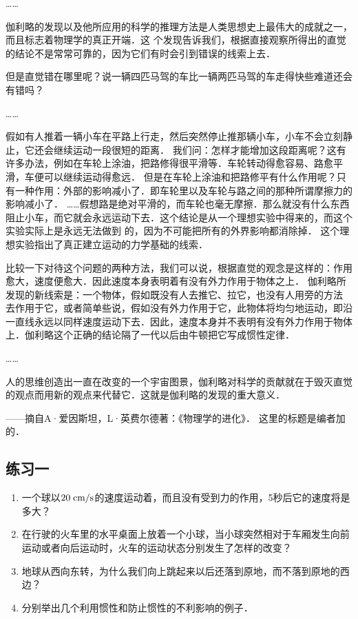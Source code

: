 ……

伽利略的发现以及他所应用的科学的推理方法是人类思想史上最伟大的成就之一，而且标志着物理学的真正开端．这
个发现告诉我们，根据直接观察所得出的直觉的结论不是常常可靠的，因为它们有时会引到错误的线索上去．

但是直觉错在哪里呢？说一辆四匹马驾的车比一辆两匹马驾的车走得快些难道还会有错吗？

……

假如有人推着一辆小车在平路上行走，然后突然停止推那辆小车，小车不会立刻静止，它还会继续运动一段很短的距离．
我们问：怎样才能增加这段距离呢？这有许多办法，例如在车轮上涂油，把路修得很平滑等．车轮转动得愈容易、路愈平滑，车便可以继续运动得愈远．
但是在车轮上涂油和把路修平有什么作用呢？只有一种作用：外部的影响减小了．即车轮里以及车轮与路之间的那种所谓摩擦力的影响减小了．
……假想路是绝对平滑的，而车轮也毫无摩擦．那么就没有什么东西阻止小车，而它就会永远运动下去．这个结论是从一个理想实验中得来的，而这个实验实际上是永远无法做到
的，因为不可能把所有的外界影响都消除掉．
这个理想实验指出了真正建立运动的力学基础的线索．

比较一下对待这个问题的两种方法，我们可以说，根据直觉的观念是这样的：作用愈大，速度便愈大．因此速度本身表明着有没有外力作用于物体之上．
伽利略所发现的新线索是：一个物体，假如既没有人去推它、拉它，也没有人用旁的方法
去作用于它，或者简单些说，假如没有外力作用于它，此物体将均匀地运动，即沿一直线永远以同样速度运动下去．因此，速度本身并不表明有没有外力作用于物体上．伽利略这个正确的结论隔了一代以后由牛顿把它写成惯性定律．

……

人的思维创造出一直在改变的一个宇宙图景，伽利略对科学的贡献就在于毁灭直觉的观点而用新的观点来代替它．这就是伽利略的发现的重大意义．


——摘自A·爱因斯坦，L·英费尔德著：《物理学的进化》．
这里的标题是编者加的．

\subsection*{练习一}
\begin{enumerate}
     \item 一个球以$20 \;\text{cm}/\text{s}$的速度运动着，而且没有受到力的作用，5秒后它的速度将是多大？
     \item 在行驶的火车里的水平桌面上放着一个小球，当小球突然相对于车厢发生向前运动或者向后运动时，火车的运动状态分别发生了怎样的改变？
     \item 地球从西向东转，为什么我们向上跳起来以后还落到原地，而不落到原地的西边？
     \item 分别举出几个利用惯性和防止惯性的不利影响的例子．
\end{enumerate}

